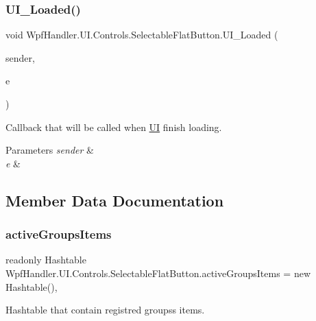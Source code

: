 \subsubsection{\texorpdfstring{U\+I\+\_\+\+Loaded()}{UI\_Loaded()}}
{\footnotesize\ttfamily void Wpf\+Handler.\+U\+I.\+Controls.\+Selectable\+Flat\+Button.\+U\+I\+\_\+\+Loaded (\begin{DoxyParamCaption}\item[{object}]{sender,  }\item[{Routed\+Event\+Args}]{e }\end{DoxyParamCaption})\hspace{0.3cm}{\ttfamily [private]}}



Callback that will be called when \mbox{\hyperlink{namespace_wpf_handler_1_1_u_i}{UI}} finish loading. 


\begin{DoxyParams}{Parameters}
{\em sender} & \\
\hline
{\em e} & \\
\hline
\end{DoxyParams}


\subsection{Member Data Documentation}
\mbox{\label{class_wpf_handler_1_1_u_i_1_1_controls_1_1_selectable_flat_button_aeda1be5761f1a96fbd14138aab118826}} 
\subsubsection{\texorpdfstring{active\+Groups\+Items}{activeGroupsItems}}
{\footnotesize\ttfamily readonly Hashtable Wpf\+Handler.\+U\+I.\+Controls.\+Selectable\+Flat\+Button.\+active\+Groups\+Items = new Hashtable()\hspace{0.3cm}{\ttfamily [static]}, {\ttfamily [private]}}



Hashtable that contain registred groups\textquotesingle{}s items. 


